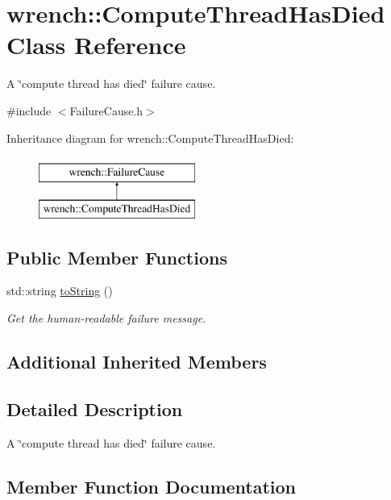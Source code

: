 \hypertarget{classwrench_1_1_compute_thread_has_died}{}\section{wrench\+:\+:Compute\+Thread\+Has\+Died Class Reference}
\label{classwrench_1_1_compute_thread_has_died}


A \char`\"{}compute thread has died\char`\"{} failure cause.  




{\ttfamily \#include $<$Failure\+Cause.\+h$>$}

Inheritance diagram for wrench\+:\+:Compute\+Thread\+Has\+Died\+:\begin{figure}[H]
\begin{center}
\leavevmode
\includegraphics[height=2.000000cm]{classwrench_1_1_compute_thread_has_died}
\end{center}
\end{figure}
\subsection*{Public Member Functions}
\begin{DoxyCompactItemize}
\item 
std\+::string \hyperlink{classwrench_1_1_compute_thread_has_died_a4725416d9ff31b39ec9d48d23d1c1c0b}{to\+String} ()
\begin{DoxyCompactList}\small\item\em Get the human-\/readable failure message. \end{DoxyCompactList}\end{DoxyCompactItemize}
\subsection*{Additional Inherited Members}


\subsection{Detailed Description}
A \char`\"{}compute thread has died\char`\"{} failure cause. 

\subsection{Member Function Documentation}
\mbox{\label{classwrench_1_1_compute_thread_has_died_a4725416d9ff31b39ec9d48d23d1c1c0b}} 
